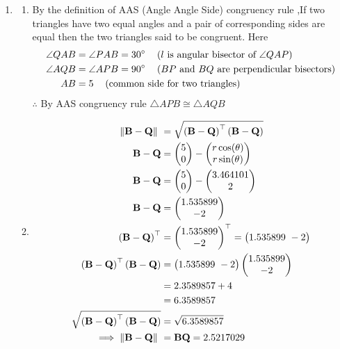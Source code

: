 \documentclass[11pt]{book}
\begin{document}
\begin{enumerate}
\item  
\begin{enumerate}
        \item By the definition of AAS (Angle Angle Side) congruency rule ,If two triangles have two equal angles and a pair of corresponding sides are equal then the two triangles said to be congruent.
%
Here
  \begin{align}
            \angle QAB  &= \angle PAB = 30\degree \hspace{12pt}   \text{($l$ is angular bisector of  $\angle QAP$)}  \\
            \angle AQB  &= \angle APB = 90 \degree  \hspace{12pt}  \text{($BP$ and $BQ$ are perpendicular bisectors)} \\
            AB &=5  \hspace{12pt}  \text{(common side for two triangles)} 
        \end{align} 
    $\therefore$ By AAS congruency rule  $\triangle  APB \cong \triangle AQB$  
    \item  \begin{align}
\norm{\vec{B}-\vec{Q}}\ &=  \sqrt{\brak{\vec{B}-\vec{Q}}^{\top}\brak{\vec{B}-\vec{Q}}} \\
\vec{B}-\vec{Q} &= \myvec{5 \\ 0} - \myvec{r\cos(\theta) \\ r\sin(\theta)} \\
\vec{B}-\vec{Q} &= \myvec{5 \\ 0} - \myvec{3.464101 \\ 2} \\
\vec{B}-\vec{Q} &= \myvec{1.535899 \\ -2} \\
\brak{\vec{B}-\vec{Q}}^{\top} &= {\myvec{1.535899 \\ -2}}^{\top} = \myvec{1.535899 \ -2} \\
\brak{\vec{B}-\vec{Q}}^{\top}\brak{\vec{B}-\vec{Q}} &= \myvec{1.535899 \ -2} \myvec{1.535899 \\ -2}\\
&= 2.3589857 + 4 \\
&= 6.3589857 \\  
\sqrt{\brak{\vec{B}-\vec{Q}}^{\top}\brak{\vec{B}-\vec{Q}}} &= \sqrt{6.3589857}	\\
	    \implies \norm{\vec{B}-\vec{Q}}\ &= \vec{BQ} = 2.5217029 
\end{align}
\begin{align}

\end{align}
\end{enumerate}
\end{enumerate}
\end{document}
